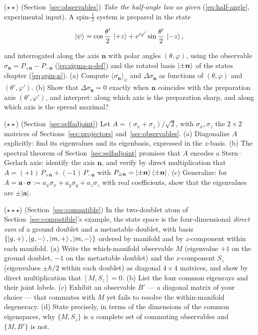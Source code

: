 \begin{problemset}
\item ($\star\star$) (Section~\ref{sec:observables}) \emph{Take the half-angle law as given} (\eqref{eq:half-angle}, experimental input). A spin-$\tfrac{1}{2}$ system is prepared in the state
\begin{linenomath}
    \begin{equation}
        \ket{\psi} = \cos\frac{\theta'}{2}\,\ket{+z} + e^{i\varphi'}\sin\frac{\theta'}{2}\,\ket{-z} ,
    \end{equation}
\end{linenomath}
and interrogated along the axis $\bm{n}$ with polar angles $(\theta,\varphi)$, using the observable $\sigma_{\bm n} = P_{+\bm n} - P_{-\bm n}$ (\eqref{eq:sigma-n-def}) and the rotated basis $\ket{\pm\bm n}$ of the states chapter (\eqref{eq:spin-n}). (a) Compute $\langle\sigma_{\bm n}\rangle_\psi$ and $\Delta\sigma_{\bm n}$ as functions of $(\theta,\varphi)$ and $(\theta',\varphi')$. (b) Show that $\Delta\sigma_{\bm n} = 0$ exactly when $\bm n$ coincides with the preparation axis $(\theta',\varphi')$, and interpret: along which axis is the preparation sharp, and along which axis is the spread maximal?

\item ($\star\star$) (Section~\ref{sec:selfadjoint}) Let $A = (\sigma_x + \sigma_z)/\sqrt{2}$, with $\sigma_x, \sigma_z$ the $2\times2$ matrices of Sections~\ref{sec:projectors} and~\ref{sec:observables}. (a) Diagonalize $A$ explicitly: find its eigenvalues and its eigenbasis, expressed in the $z$-basis. (b) The spectral theorem of Section~\ref{sec:selfadjoint} promises that $A$ encodes a Stern--Gerlach axis: identify the axis $\bm{n}$, and verify by direct multiplication that $A = (+1)\,P_{+\bm n} + (-1)\,P_{-\bm n}$ with $P_{\pm\bm n} = \ket{\pm\bm n}\bra{\pm\bm n}$. (c) Generalize: for $A = \bm{a}\cdot\bm{\sigma} := a_x\sigma_x + a_y\sigma_y + a_z\sigma_z$ with real coefficients, show that the eigenvalues are $\pm|\bm{a}|$.

\item ($\star\star\star$) (Section~\ref{sec:compatible}) In the two-doublet atom of Section~\ref{sec:compatible}'s example, the state space is the four-dimensional \emph{direct sum} of a ground doublet and a metastable doublet, with basis $\{\ket{g,+},\ket{g,-},\ket{m,+},\ket{m,-}\}$ ordered by manifold and by $z$-component within each manifold. (a) Write the which-manifold observable $M$ (eigenvalue $+1$ on the ground doublet, $-1$ on the metastable doublet) and the $z$-component $S_z$ (eigenvalues $\pm\hbar/2$ within each doublet) as diagonal $4\times4$ matrices, and show by direct multiplication that $[M,S_z] = 0$. (b) List the four common eigenrays and their joint labels. (c) Exhibit an observable $B'$ --- a diagonal matrix of your choice --- that commutes with $M$ yet fails to resolve the within-manifold degeneracy. (d) State precisely, in terms of the dimensions of the common eigenspaces, why $\{M,S_z\}$ is a complete set of commuting observables and $\{M,B'\}$ is not.


\end{problemset}
